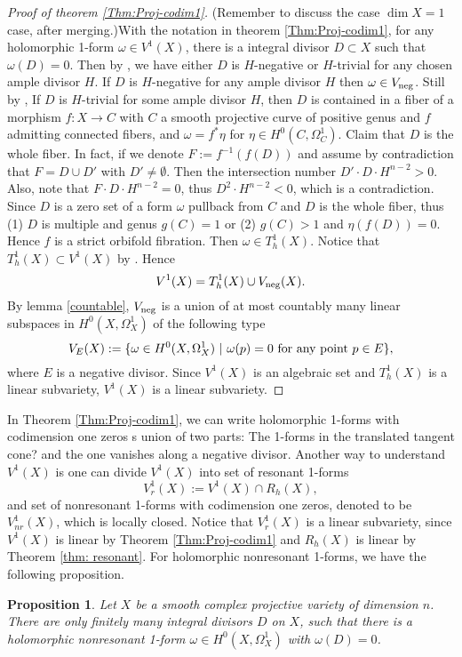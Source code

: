 \documentclass[12pt,reqno]{amsart}
\newtheorem{proposition}[theorem]{Proposition}
\theoremstyle{question}
\theoremstyle{definition}
\theoremstyle{remark}
\theoremstyle{cited}
\theoremstyle{citeddef}
\begin{document}
\begin{proof}[Proof  of theorem \ref{Thm:Proj-codim1}]
{\color{red}(Remember to discuss the case $\dim X=1$ case, after merging.)}With the notation in theorem \ref{Thm:Proj-codim1},  for any holomorphic 1-form $\omega\in V^1(X)$, there is a integral divisor $D\subset X$ such that $\omega(D)=0$. Then by \cite[theorem 2]{Sp88}, we have either $D$ is $H$-negative or $H$-trivial for any chosen ample divisor $H$. If $D$ is $H$-negative for any ample divisor $H$ then $\omega\in V_{\textnormal{neg}}$. Still by \cite[theorem 2]{Sp88}, If $D$ is $H$-trivial for some ample divisor $H$, then $D$ is contained in a fiber of a morphism $f: X\to C$ with $C$ a smooth projective curve of positive genus and $f$ admitting connected fibers, and $\omega=f^*\eta$ for $\eta\in H^0(C, \Omega_C^1)$. Claim that $D$ is the whole fiber. In fact, if we denote $F:=f^{-1}(f(D))$ and assume by contradiction that $F=D\cup D'$ with $D'\not=\emptyset$. Then the intersection number $D'\cdot D\cdot H^{n-2}>0$. Also, note that $F\cdot D\cdot H^{n-2}=0$, thus $D^2\cdot H^{n-2}<0$, which is a contradiction. Since $D$ is a zero set of a form $\omega$ pullback from $C$ and $D$ is the whole fiber, thus (1) $D$ is multiple and genus $g(C)=1$ or (2) $g(C)>1$ and $\eta(f(D))=0$. Hence $f$ is a strict orbifold fibration. Then $\omega\in T_h^1(X)$. Notice that $T_h^1(X)\subset V^1(X)$ by \cite{GL87}. Hence $$V^1(X)= T_h^1(X)\cup V_{\textnormal{neg}}(X).
$$
By lemma \ref{countable}, $V_{\textnormal{neg}}$ is a union of at most countably many linear subspaces in $H^0(X, \Omega_X^1)$ of the following type $$V_E(X):=\{\omega\in H^0(X, \Omega_X^1)\ |\ \omega(p)=0\  \textnormal{for any point}\ p\in E\},$$ where $E$ is a negative divisor. Since $V^1(X)$ is an algebraic set and $T_h^1(X)$ is a linear subvariety, $V^1(X)$ is a linear subvariety.
 \end{proof} 
 
 In Theorem \ref{Thm:Proj-codim1}, we can write holomorphic 1-forms with codimension one zeros s union of two parts: The 1-forms in the {\color{red} translated tangent cone?} and the one vanishes along a negative divisor.  Another way to understand  $V^1(X)$ is one can divide $V^1(X)$ into set of resonant 1-forms $$V^1_r(X):=V^1(X)\cap R_h(X),$$ and set of nonresonant 1-forms with codimension one zeros, denoted to be $V^1_{nr}(X)$, which is locally closed. Notice that $V_r^1(X)$ is a linear subvariety, since $V^1(X)$ is linear by Theorem \ref{Thm:Proj-codim1}  and $R_h(X)$ is linear by Theorem \ref{thm: resonant}. For holomorphic nonresonant 1-forms,  we have the following proposition.
 \begin{proposition}
Let $X$ be a smooth complex projective variety of dimension $n$. There are only finitely many integral divisors $D$ on $X$, such that there is a holomorphic nonresonant 1-form $\omega\in H^0(X, \Omega_X^1)$ with $\omega(D)=0$.
 \end{proposition}
 
\end{document}

